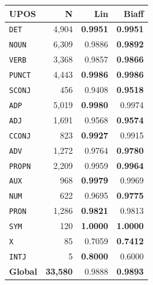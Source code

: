 \begin{table}[ht]
\begin{minipage}[t]{0.60\linewidth}
\begin{tabular}{l r  r r r r}
\bottomrule
\end{tabular}
\end{minipage}
\hfill
\begin{minipage}[t]{0.37\linewidth}
\centering
\begin{tabular}{l r  r r}
\toprule
\textbf{UPOS} & \textbf{N} & \textbf{Lin} & \textbf{Biaff} \\
\midrule
\texttt{DET} & 4,904 & \textbf{0.9951} & \textbf{0.9951} \\
\texttt{NOUN} & 6,309 & 0.9886 & \textbf{0.9892} \\
\texttt{VERB} & 3,368 & 0.9857 & \textbf{0.9866} \\
\texttt{PUNCT} & 4,443 & \textbf{0.9986} & \textbf{0.9986} \\
\texttt{SCONJ} & 456 & 0.9408 & \textbf{0.9518} \\
\texttt{ADP} & 5,019 & \textbf{0.9980} & 0.9974 \\
\texttt{ADJ} & 1,691 & 0.9568 & \textbf{0.9574} \\
\texttt{CCONJ} & 823 & \textbf{0.9927} & 0.9915 \\
\texttt{ADV} & 1,272 & 0.9764 & \textbf{0.9780} \\
\texttt{PROPN} & 2,209 & 0.9959 & \textbf{0.9964} \\
\texttt{AUX} & 968 & \textbf{0.9979} & 0.9969 \\
\texttt{NUM} & 622 & 0.9695 & \textbf{0.9775} \\
\texttt{PRON} & 1,286 & \textbf{0.9821} & 0.9813 \\
\texttt{SYM} & 120 & \textbf{1.0000} & \textbf{1.0000} \\
\texttt{X} & 85 & 0.7059 & \textbf{0.7412} \\
\texttt{INTJ} & 5 & \textbf{0.8000} & 0.6000 \\
\midrule
\textbf{Global} & \textbf{33,580} & 0.9888 & \textbf{0.9893} \\
\bottomrule
\end{tabular}
\end{minipage}
\end{table}


